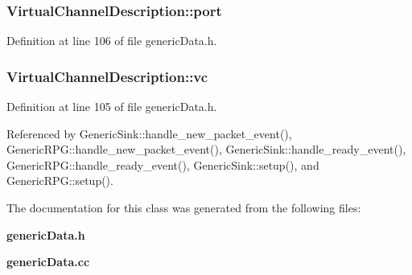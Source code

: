 \subsubsection[{port}]{ {\bf VirtualChannelDescription::port}}\label{classVirtualChannelDescription_f9d604a874c2a0239eb9a63dbf95308e}




Definition at line 106 of file genericData.h.
\subsubsection[{vc}]{ {\bf VirtualChannelDescription::vc}}\label{classVirtualChannelDescription_efa589385b11e2b9450ed4132964bc71}




Definition at line 105 of file genericData.h.

Referenced by GenericSink::handle\_\-new\_\-packet\_\-event(), GenericRPG::handle\_\-new\_\-packet\_\-event(), GenericSink::handle\_\-ready\_\-event(), GenericRPG::handle\_\-ready\_\-event(), GenericSink::setup(), and GenericRPG::setup().

The documentation for this class was generated from the following files:\begin{CompactItemize}
\item 
{\bf genericData.h}\item 
{\bf genericData.cc}\end{CompactItemize}
